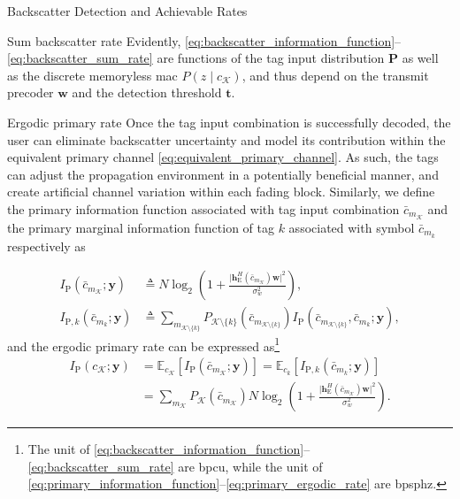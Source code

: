 \documentclass[journal]{IEEEtran}
\begin{document}
\begin{section}{Backscatter Detection and Achievable Rates}
\begin{subsection}{Sum backscatter rate}
			Evidently, \eqref{eq:backscatter_information_function}--\eqref{eq:backscatter_sum_rate} are functions of the tag input distribution $\boldsymbol{P}$ as well as the discrete memoryless \gls{mac} $P(z \mid c_{\mathcal{K}})$, and thus depend on the transmit precoder $\boldsymbol{w}$ and the detection threshold $\boldsymbol{t}$.
		\end{subsection}

		\begin{subsection}{Ergodic primary rate}
			Once the tag input combination is successfully decoded, the user can eliminate backscatter uncertainty and model its contribution within the equivalent primary channel \eqref{eq:equivalent_primary_channel}. As such, the tags can adjust the propagation environment in a potentially beneficial manner, and create artificial channel variation within each fading block. Similarly, we define the primary information function associated with tag input combination $\bar{c}_{m_{\mathcal{K}}}$ and the primary marginal information function of tag $k$ associated with symbol $\bar{c}_{m_k}$ respectively as

			\begin{align}
				I_{\mathrm{P}}(\bar{c}_{m_{\mathcal{K}}};\boldsymbol{y})
				& \triangleq N \log_2 \left(1 + \frac{\lvert \boldsymbol{h}_{\mathrm{E}}^H(\bar{c}_{m_{\mathcal{K}}}) \boldsymbol{w} \rvert^2}{\sigma_w^2}\right),\label{eq:primary_information_function}\\
				I_{\mathrm{P},k}(\bar{c}_{m_k};\boldsymbol{y})
				& \triangleq \sum_{m_{\mathcal{K} \setminus \{k\}}} P_{\mathcal{K} \setminus \{k\}}(\bar{c}_{m_{\mathcal{K} \setminus \{k\}}}) I_{\mathrm{P}}(\bar{c}_{m_{\mathcal{K} \setminus \{k\}}},\bar{c}_{m_k};\boldsymbol{y}),\label{eq:primary_marginal_information_function}
			\end{align}
			and the ergodic primary rate can be expressed as\footnote{The unit of \eqref{eq:backscatter_information_function}--\eqref{eq:backscatter_sum_rate} are \gls{bpcu}, while the unit of \eqref{eq:primary_information_function}--\eqref{eq:primary_ergodic_rate} are \gls{bpsphz}.}
			\begin{subequations}
				\begin{align}
					I_{\mathrm{P}}(c_{\mathcal{K}};\boldsymbol{y})
					& = \mathbb{E}_{c_{\mathcal{K}}} \left[I_{\mathrm{P}}(\bar{c}_{m_{\mathcal{K}}};\boldsymbol{y})\right] = \mathbb{E}_{c_k} \left[I_{\mathrm{P},k}(\bar{c}_{m_k};\boldsymbol{y})\right]\label{eq:primary_ergodic_rate_expectation}\\
					& = \sum_{m_{\mathcal{K}}} P_{\mathcal{K}}(\bar{c}_{m_{\mathcal{K}}}) N \log_2 \left(1 + \frac{\lvert \boldsymbol{h}_{\mathrm{E}}^H(\bar{c}_{m_{\mathcal{K}}}) \boldsymbol{w} \rvert^2}{\sigma_w^2}\right).
					\label{eq:primary_ergodic_rate_expansion}
				\end{align}
				\label{eq:primary_ergodic_rate}
			\end{subequations}


\end{subsection}
\end{section}
\end{document}
